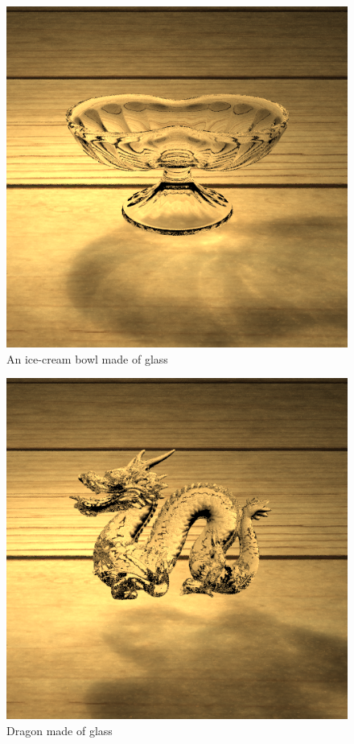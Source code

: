 \documentclass[acmtog]{acmart}
\begin{document}
\begin{figure}[h]
		\centering
		\includegraphics[scale=0.3]{Images/icecream.png}
		\caption{An ice-cream bowl made of glass}
	\end{figure}
	\begin{figure}[h]
		\centering
		\includegraphics[scale=0.3]{Images/dragon.png}
		\caption{Dragon made of glass}
	\end{figure}	
\end{document}
